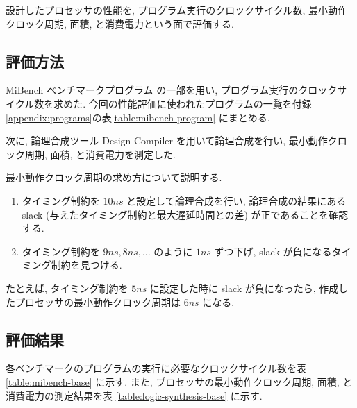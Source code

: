 \documentclass[../main.tex]{subfiles}
\begin{document}
  設計したプロセッサの性能を, プログラム実行のクロックサイクル数, 
  最小動作クロック周期, 面積, と消費電力という面で評価する.

  \subsection{評価方法}
  MiBench ベンチマークプログラム \cite{mibench} の一部を用い, プログラム実行のクロックサイクル数を求めた.
  今回の性能評価に使われたプログラムの一覧を付録\ref{appendix:programs}の表\ref{table:mibench-program} にまとめる.

  次に, 論理合成ツール Design Compiler を用いて論理合成を行い, 
  最小動作クロック周期, 面積, と消費電力を測定した.

  最小動作クロック周期の求め方について説明する.
  \begin{enumerate}
    \item タイミング制約を $10ns$ と設定して論理合成を行い, 
    論理合成の結果にある slack (与えたタイミング制約と最大遅延時間との差) が正であることを確認する.
    \item タイミング制約を $9ns, 8ns, \ldots$ のように $1ns$ ずつ下げ, 
    slack が負になるタイミング制約を見つける.
  \end{enumerate}

  たとえば, タイミング制約を $5ns$ に設定した時に slack が負になったら, 
  作成したプロセッサの最小動作クロック周期は $6ns$ になる.

  \subsection{評価結果}
  各ベンチマークのプログラムの実行に必要なクロックサイクル数を表 \ref{table:mibench-base} に示す.
  また, プロセッサの最小動作クロック周期, 面積, と消費電力の測定結果を表 \ref{table:logic-synthesis-base} に示す.

  \begin{table}[tbh]
    \centering
    \caption{ベンチマークプログラムの実行クロックサイクル数(改善前)}
    \label{table:mibench-base}
  \end{table}

  \begin{table}[tbh]
    \centering
    \caption{論理合成の結果(改善前)}
    \label{table:logic-synthesis-base}
  \end{table}
\end{document}
